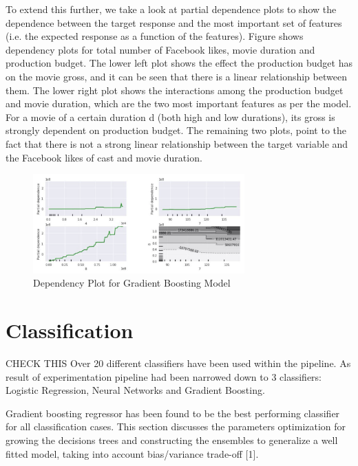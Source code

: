 To extend this further, we take a look at partial dependence plots to show the dependence between the target response and the most important set of features (i.e. the expected response as a function of the features). Figure shows dependency plots for total number of Facebook likes, movie duration and production budget. The lower left plot shows the effect the production budget has on the movie gross, and it can be seen that there is a linear relationship between them. The lower right plot shows the interactions among the production budget and movie duration, which are the two most important features as per the model. For a movie of a certain duration d (both high and low durations), its gross is strongly dependent on production budget.  The remaining two plots, point to the fact that there is not a strong linear relationship between the target variable and the Facebook likes of cast and movie duration.

\begin{figure}[h]
\centering
\includegraphics[width=3.2in]{figures/gradient_boost_dependency}
\caption{Dependency Plot for Gradient Boosting Model \cite{figgradientdep}}
\label{fig:figgradientdep}
\end{figure}
\section{Classification}
CHECK THIS
Over 20 different classifiers have been used within the pipeline. As result of experimentation pipeline had been narrowed down to 3 classifiers: Logistic Regression, Neural Networks and Gradient Boosting.

Gradient boosting regressor has been found to be the best performing classifier for all classification cases. This section discusses the parameters optimization for growing the decisions trees and constructing the ensembles to generalize a well fitted model, taking into account bias/variance trade-off [1].

